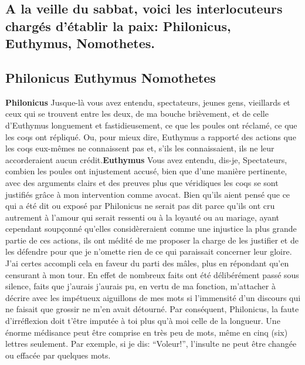 \documentclass[12pt]{book}
\begin{document}
\begin{pages}
        \begin{Rightside}
        \beginnumbering
            \pstart\section*{A la veille du sabbat, voici les interlocuteurs chargés d’établir la paix: Philonicus, Euthymus, Nomothetes.}\pend\pstart\subsection*{ Philonicus Euthymus Nomothetes}\pend\pstart\textbf{Philonicus}\hspace{1cm} Jusque-là vous avez entendu, spectateurs, jeunes gens, vieillards et ceux qui se trouvent entre les deux, de ma bouche brièvement, et de celle d’Euthymus longuement et fastidieusement, ce que les poules ont réclamé, ce que les coqs ont répliqué. Ou, pour mieux dire, Euthymus a rapporté des actions que les coqs eux-mêmes ne connaissent pas et, s'ils les connaissaient, ils ne leur accorderaient aucun crédit.\pend\pstart\textbf{Euthymus }\hspace{1cm} Vous avez entendu, dis-je, Spectateurs, combien les poules ont injustement accusé, bien que d'une manière pertinente, avec des arguments clairs et des preuves plus que véridiques les coqs se sont justifiés grâce à mon intervention comme avocat.
                        Bien qu’ils aient pensé que ce qui a été dit ou exposé par Philonicus ne serait pas dit parce qu'ils ont cru autrement à l'amour qui serait ressenti ou à la loyauté ou au mariage, ayant cependant soupçonné qu’elles considèreraient comme une injustice la plus grande partie de ces actions, ils ont médité de me proposer la charge de les justifier et de les défendre pour que je n'omette rien de ce qui paraissait concerner leur gloire.
                        J’ai certes accompli cela en faveur du parti des mâles, plus en répondant qu’en censurant à mon tour. En effet de nombreux faits ont été délibérément passé sous silence, faits que  j'aurais j’aurais pu, en vertu de ma fonction, m’attacher à décrire avec les impétueux aiguillons de mes mots si l’immensité d’un discours qui ne faisait que grossir ne m’en avait détourné.
                        Par conséquent, Philonicus, la faute d’irréflexion doit t’être imputée à toi plus qu’à moi celle de la longueur. Une énorme médisance peut être comprise en très peu de mots, même en cinq (six) lettres seulement. Par exemple, si je dis: “Voleur!”, l’insulte ne peut être changée ou effacée par quelques mots.

\end{Rightside}
\end{pages}
\end{document}
